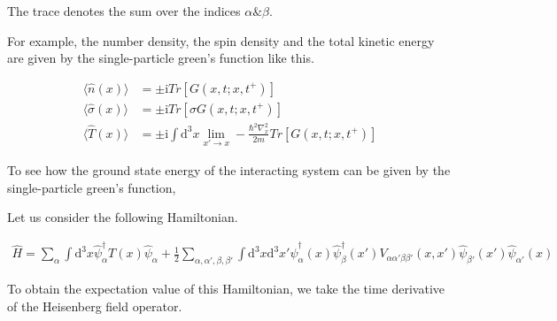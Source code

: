 The trace denotes the sum over the indices $\alpha \& \beta$.

For example, the number density, the spin density and the total kinetic energy are given by the single-particle green's function like this.

\begin{align}
\langle\hat{n}(x)\rangle&=\pm\mathrm{i}Tr[G(x,t;x,t^+)] \nonumber \\
\langle\hat{\sigma}(x)\rangle&=\pm\mathrm{i}Tr[\sigma G(x,t;x,t^+)] \nonumber \\
\langle\hat{T}(x)\rangle&=\pm\mathrm{i}\int \mathrm{d}^3x \lim_{x'\rightarrow x}-\frac{\hbar^2\nabla^2_x}{2m}Tr[G(x,t;x,t^+)]  \nonumber
\end{align}

To see how the ground  state energy  of the interacting system can be given by the single-particle green's function,

Let us consider the following Hamiltonian.

\begin{align}\label{2.3.3}
\hat H=\sum_{\alpha}\int \mathrm{d}^3x \hat \psi^{\dagger}_{\alpha}T(x)\hat \psi_{\alpha}+\frac{1}{2}\sum_{\alpha,\alpha',\beta,\beta'}\int \mathrm{d}^3x\mathrm{d}^3x'\hat \psi^{\dagger}_{\alpha}(x)\hat \psi^{\dagger}_{\beta}(x')V_{\alpha\alpha'\beta\beta'}(x,x')\hat \psi_{\beta'}(x')\hat \psi_{\alpha'}(x) 
\end{align}

To obtain the expectation value of this Hamiltonian, we take the time derivative of the Heisenberg field operator.

